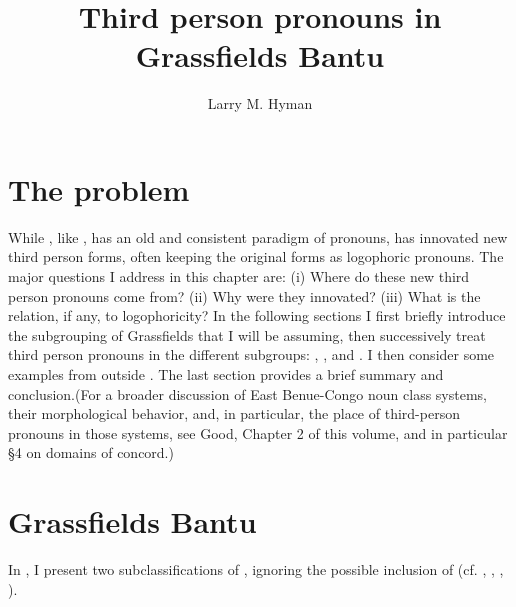 \documentclass[output=paper]{langsci/langscibook}
\author{Larry M. Hyman\affiliation{University of California, Berkeley}}
\title{Third person pronouns in Grassfields Bantu}
\begin{document}
 
\label{sec:6}

\section{The problem} 
While , like , has an old and consistent paradigm of pronouns,  has innovated new third person forms, often keeping the original forms as logophoric pronouns. The major questions I address in this chapter are: (i) Where do these new third person pronouns come from? (ii) Why were they innovated? (iii) What is the relation, if any, to logophoricity? In the following sections I first briefly introduce the subgrouping of Grassfields  that I will be assuming, then successively treat third person pronouns in the different subgroups: , , and . I then consider some examples from outside . The last section provides a brief summary and conclusion.(For a broader discussion of East Benue-Congo noun class systems, their morphological behavior, and, in particular, the place of third-person pronouns in those systems, see Good, Chapter 2 of this volume, and in particular §4 on domains of concord.)

\section{Grassfields Bantu} 

In , I present two subclassifications of , ignoring the possible inclusion of  (cf. \citealt{Stallcup1980geo}, \citealt{WattersLeroy1989}, \citealt{Piron1995}, \citealt{Watters2003}).


\end{document}
